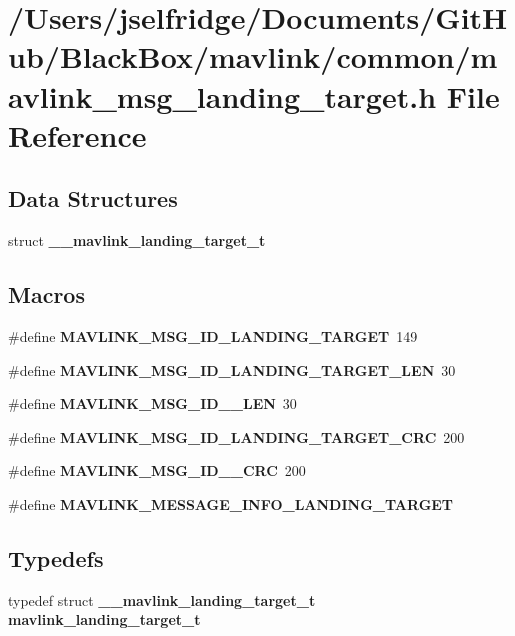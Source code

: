 \section{/\+Users/jselfridge/\+Documents/\+Git\+Hub/\+Black\+Box/mavlink/common/mavlink\+\_\+msg\+\_\+landing\+\_\+target.h File Reference}
\label{mavlink__msg__landing__target_8h}
\subsection*{Data Structures}
\begin{DoxyCompactItemize}
\item 
struct \textbf{ \+\_\+\+\_\+mavlink\+\_\+landing\+\_\+target\+\_\+t}
\end{DoxyCompactItemize}
\subsection*{Macros}
\begin{DoxyCompactItemize}
\item 
\#define \textbf{ M\+A\+V\+L\+I\+N\+K\+\_\+\+M\+S\+G\+\_\+\+I\+D\+\_\+\+L\+A\+N\+D\+I\+N\+G\+\_\+\+T\+A\+R\+G\+ET}~149
\item 
\#define \textbf{ M\+A\+V\+L\+I\+N\+K\+\_\+\+M\+S\+G\+\_\+\+I\+D\+\_\+\+L\+A\+N\+D\+I\+N\+G\+\_\+\+T\+A\+R\+G\+E\+T\+\_\+\+L\+EN}~30
\item 
\#define \textbf{ M\+A\+V\+L\+I\+N\+K\+\_\+\+M\+S\+G\+\_\+\+I\+D\+\_\+\_\+\+L\+EN}~30
\item 
\#define \textbf{ M\+A\+V\+L\+I\+N\+K\+\_\+\+M\+S\+G\+\_\+\+I\+D\+\_\+\+L\+A\+N\+D\+I\+N\+G\+\_\+\+T\+A\+R\+G\+E\+T\+\_\+\+C\+RC}~200
\item 
\#define \textbf{ M\+A\+V\+L\+I\+N\+K\+\_\+\+M\+S\+G\+\_\+\+I\+D\+\_\+\_\+\+C\+RC}~200
\item 
\#define \textbf{ M\+A\+V\+L\+I\+N\+K\+\_\+\+M\+E\+S\+S\+A\+G\+E\+\_\+\+I\+N\+F\+O\+\_\+\+L\+A\+N\+D\+I\+N\+G\+\_\+\+T\+A\+R\+G\+ET}
\end{DoxyCompactItemize}
\subsection*{Typedefs}
\begin{DoxyCompactItemize}
\item 
typedef struct \textbf{ \+\_\+\+\_\+mavlink\+\_\+landing\+\_\+target\+\_\+t} \textbf{ mavlink\+\_\+landing\+\_\+target\+\_\+t}
\end{DoxyCompactItemize}


